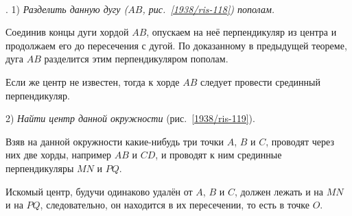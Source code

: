 \paragraph{}\label{1938/108}
\mbox{.}
1) \emph{Разделить данную дугу \emph{($AB$, рис.~\ref{1938/ris-118})} пополам.}

Соединив концы дуги хордой $AB$, опускаем на неё перпендикуляр из центра и продолжаем его до пересечения с дугой.
По доказанному в предыдущей теореме, дуга $AB$ разделится этим перпендикуляром пополам.

Если же центр не известен, тогда к хорде $AB$ следует провести срединный перпендикуляр. 

2) \emph{Найти центр данной окружности} (рис.~\ref{1938/ris-119}).

Взяв на данной окружности какие-нибудь три точки $A$, $B$ и $C$, проводят через них две хорды, например $AB$ и $CD$, и проводят к ним срединные перпендикуляры $MN$ и $PQ$. 

Искомый центр, будучи одинаково удалён от $A$, $B$ и $C$, должен лежать и на $MN$ и на $PQ$, следовательно, он находится в их пересечении, то есть в точке $O$.


